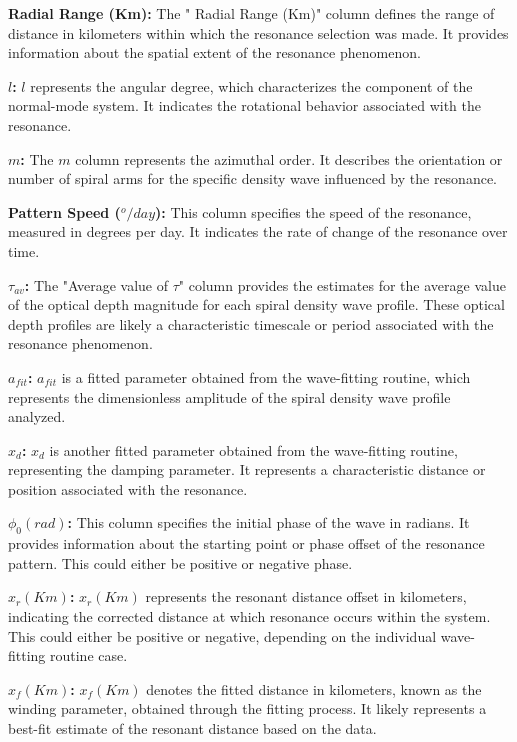 \documentclass{article}
\begin{document}
\textbf{Radial Range (Km):} The " Radial Range (Km)" column defines the range of distance in kilometers within which the resonance selection was made. It provides information about the spatial extent of the resonance phenomenon.
    
\textbf{\(l\):} \(l\) represents the angular degree, which characterizes the component of the normal-mode system. It indicates the rotational behavior associated with the resonance.
    
\textbf{\(m\):} The \(m\) column represents the azimuthal order. It describes the orientation or number of spiral arms for the specific density wave influenced by the resonance.
    
\textbf{Pattern Speed (\(^{o}/day\)):} This column specifies the speed of the resonance, measured in degrees per day. It indicates the rate of change of the resonance over time.
    
\textbf{$\tau_{av}$:} The "Average value of \(\tau\)" column provides the estimates for the average value of the optical depth magnitude for each spiral density wave profile. These optical depth profiles are likely a characteristic timescale or period associated with the resonance phenomenon.
    
\textbf{\(a_{fit}\):} \(a_{fit}\) is a fitted parameter obtained from the wave-fitting routine, which represents the dimensionless amplitude of the spiral density wave profile analyzed.
    
\textbf{\(x_{d}\):} \(x_{d}\) is another fitted parameter obtained from the wave-fitting routine, representing the damping parameter. It represents a characteristic distance or position associated with the resonance.
    
\textbf{\(\phi_{0}(rad)\):} This column specifies the initial phase of the wave in radians. It provides information about the starting point or phase offset of the resonance pattern. This could either be positive or negative phase.
    
\textbf{\(x_{r}(Km)\):} \(x_{r}(Km)\) represents the resonant distance offset in kilometers, indicating the corrected distance at which resonance occurs within the system. This could either be positive or negative, depending on the individual wave-fitting routine case.
    
\textbf{\(x_{f}(Km)\):} \(x_{f}(Km)\) denotes the fitted distance in kilometers, known as the winding parameter, obtained through the fitting process. It likely represents a best-fit estimate of the resonant distance based on the data.
\end{document}
